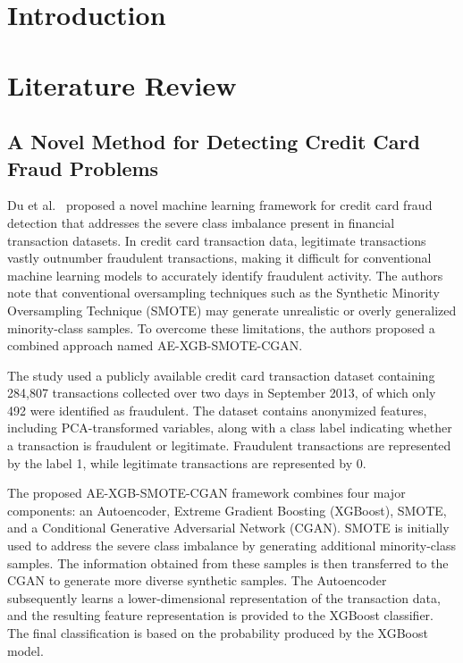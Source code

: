 \documentclass[12pt, a4paper]{report}
\begin{document}
\chapter{Introduction}



\chapter{Literature Review}

\section{A Novel Method for Detecting Credit Card Fraud Problems}

Du et al.~\cite{du2024novel} proposed a novel machine learning framework for credit card fraud detection that addresses the severe class imbalance present in financial transaction datasets. In credit card transaction data, legitimate transactions vastly outnumber fraudulent transactions, making it difficult for conventional machine learning models to accurately identify fraudulent activity. The authors note that conventional oversampling techniques such as the Synthetic Minority Oversampling Technique (SMOTE) may generate unrealistic or overly generalized minority-class samples. To overcome these limitations, the authors proposed a combined approach named AE-XGB-SMOTE-CGAN.

The study used a publicly available credit card transaction dataset containing 284,807 transactions collected over two days in September 2013, of which only 492 were identified as fraudulent. The dataset contains anonymized features, including PCA-transformed variables, along with a class label indicating whether a transaction is fraudulent or legitimate. Fraudulent transactions are represented by the label 1, while legitimate transactions are represented by 0.

The proposed AE-XGB-SMOTE-CGAN framework combines four major components: an Autoencoder, Extreme Gradient Boosting (XGBoost), SMOTE, and a Conditional Generative Adversarial Network (CGAN). SMOTE is initially used to address the severe class imbalance by generating additional minority-class samples. The information obtained from these samples is then transferred to the CGAN to generate more diverse synthetic samples. The Autoencoder subsequently learns a lower-dimensional representation of the transaction data, and the resulting feature representation is provided to the XGBoost classifier. The final classification is based on the probability produced by the XGBoost model.
\end{document}

